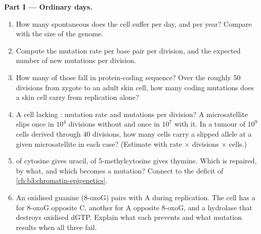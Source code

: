 \begin{problem}
\medskip
\noindent\textbf{Part I --- Ordinary days.}
\begin{enumerate}
  \item How many spontaneous  does the cell suffer per day,
        and per year? Compare with the size of the genome.
  \item Compute the mutation rate per base pair per division, and the
        expected number of new mutations per division.
  \item How many of those fall in protein-coding sequence? Over the
        roughly $50$ divisions from zygote to an adult skin cell, how
        many coding mutations does a skin cell carry from replication
        alone?
  \item A cell lacking : mutation rate and mutations
        per division? A microsatellite slips once in $10^{4}$
        divisions without  and once in $10^{7}$ with
        it. In a tumour of $10^{9}$ cells derived through $40$
        divisions, how many cells carry a slipped allele at a given
        microsatellite in each case? (Estimate with rate $\times$
        divisions $\times$ cells.)
  \item {} of cytosine gives uracil, of 5-methylcytosine
        gives thymine. Which is repaired, by what, and which becomes a
        mutation? Connect to the  deficit of
        \cref{ch:b3:chromatin-epigenetics}.
  \item An oxidised guanine (8-oxoG) pairs with A during replication.
        The cell has a  for 8-oxoG opposite C, another for
        A opposite 8-oxoG, and a hydrolase that destroys oxidised dGTP.
        Explain what each prevents and what mutation results when all
        three fail.
\end{enumerate}


\end{problem}
